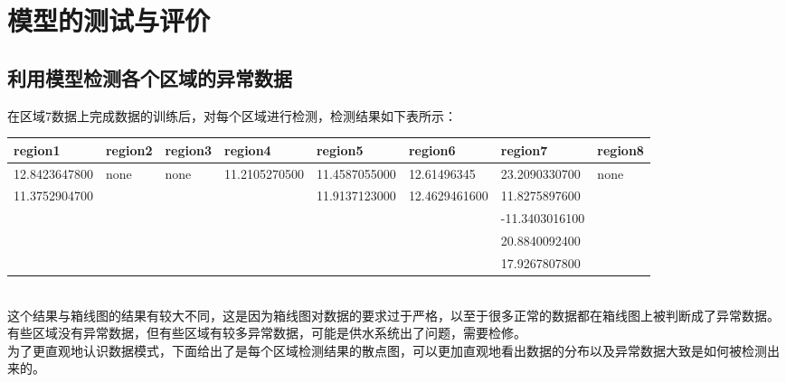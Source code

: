 \documentclass[UTF8]{article}
\begin{document}
	\section{模型的测试与评价}
			\subsection{利用模型检测各个区域的异常数据}
			在区域7数据上完成数据的训练后，对每个区域进行检测，检测结果如下表所示：
			\begin{table}[!ht]
				\centering
				\resizebox{0.8\textwidth}{!}
				{
				\begin{tabular}{|l|l|l|l|l|l|l|l|}
				\hline
					region1 & region2 & region3 & region4 & region5 & region6 & region7 & region8 \\ \hline
					12.8423647800  & none & none & 11.2105270500  & 11.4587055000  & 12.61496345 & 23.2090330700  & none \\ \hline
					11.3752904700  & ~ & ~ & ~ & 11.9137123000  & 12.4629461600  & 11.8275897600  & ~ \\ \hline
					~ & ~ & ~ & ~ & ~ & ~ & -11.3403016100  & ~ \\ \hline
					~ & ~ & ~ & ~ & ~ & ~ & 20.8840092400  & ~ \\ \hline
					~ & ~ & ~ & ~ & ~ & ~ & 17.9267807800 & ~ \\ \hline
				\end{tabular}
				}
			\end{table}
			\\这个结果与箱线图的结果有较大不同，这是因为箱线图对数据的要求过于严格，以至于很多正常的数据都在箱线图上被判断成了异常数据。有些区域没有异常数据，但有些区域有较多异常数据，可能是供水系统出了问题，需要检修。
			\\为了更直观地认识数据模式，下面给出了是每个区域检测结果的散点图，可以更加直观地看出数据的分布以及异常数据大致是如何被检测出来的。
			\newpage
\end{document}
